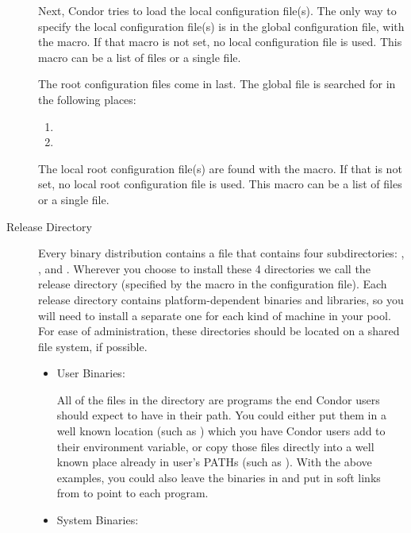 \begin{description}
Next, Condor tries to load the local configuration file(s).
The only way to specify the local configuration file(s) is in the global configuration
file, with the  macro.  If that macro is not
set, no local configuration file is used.  This macro can be a list of files
or a single file.

The root configuration files come in last.  The global file is searched for
in the following places:
\begin{enumerate}
   \item {}
   \item {}
\end{enumerate}

The local root configuration file(s) are found with the
 macro.  If that is not set, no local
root configuration file is used.  This
macro can be a list of files or a single file.

\item[Release Directory]

Every binary distribution contains a  file that contains
four subdirectories: , ,  and .
Wherever you
choose to install these 4 directories we call the release directory
(specified by the  macro in the configuration file).
Each
release directory contains platform-dependent binaries and libraries,
so you will need to install a separate one for each kind of machine in
your pool.  For ease of administration, these directories should be
located on a shared file system, if possible.

\begin{itemize}
     \item User Binaries:

     All of the files in the  directory are programs the end
     Condor users should expect to have in their path.  You could
     either put them in a well known location (such as
     ) which you have Condor users add to
     their  environment variable, or copy those files
     directly into a well known place already in user's PATHs (such as
     ).  With the above examples, you could also
     leave the binaries in  and put in
     soft links from  to point to each program.

     \item System Binaries:


\end{itemize}
\end{description}
